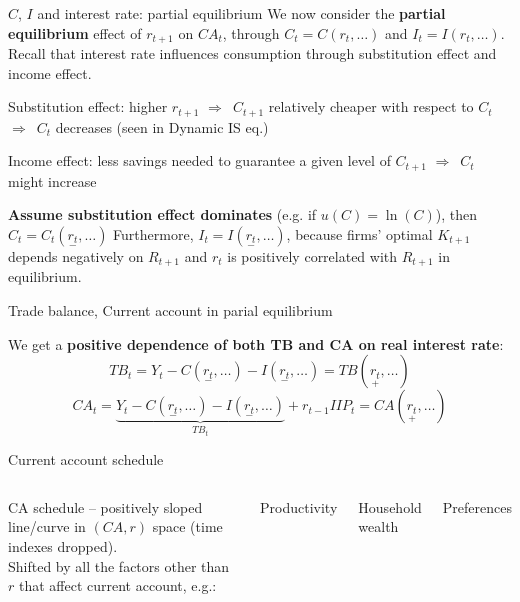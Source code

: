 \documentclass{beamer}
\newenvironment{mytemize}
{\vfill\itemize[nolistsep,itemsep=\fill,label=\color{blue}{$\triangleright$}]}
  {\enditemize}
\newenvironment{mynumerate}
{\vfill\enumerate[nolistsep,itemsep=\fill,label=\arabic*.]}
  {\endenumerate}
\newcommand{\rarr}{$\Rightarrow$\ }
\begin{document}
\begin{frame}{$C$, $I$ and interest rate: partial equilibrium}
  We now consider the \textbf{partial equilibrium} effect of $r_{t+1}$ on $CA_t$, through $C_t = C(r_{t}, \dots)$ and $I_t = I(r_{t}, \dots)$.
  \vfill
  Recall that interest rate influences consumption through substitution effect and income effect.
  \begin{mynumerate}
  \item Substitution effect: higher $r_{t+1}$ \rarr $C_{t+1}$ relatively cheaper with respect to $C_t$ \rarr $C_t$ decreases (seen in Dynamic IS eq.)
  \item Income effect: less savings needed to guarantee a given level of $C_{t+1}$ \rarr $C_t$ might increase
  \end{mynumerate}

  \textbf{Assume substitution effect dominates} (e.g. if $u(C) = \ln(C)$), then $C_t = C_t(\underset{-}{r_{t}}, \dots)$
  \vfill 
  Furthermore, $I_t = I(\underset{-}{r_{t}}, \dots)$, because firms' optimal $K_{t+1}$ depends negatively on $R_{t+1}$ and $r_t$ is positively correlated with $R_{t+1}$ in equilibrium.
\end{frame}

\begin{frame}{Trade balance, Current account in parial equilibrium}

We get a \textbf{positive dependence of both TB and CA on real interest rate}:
      $$TB_t = Y_t - C(\underset{-}{r_{t}},\dots) - I(\underset{-}{r_{t}}, \dots)= TB(\underset{+}{r_{t}},\dots)$$
      $$CA_t = \underbrace{Y_t - C(\underset{-}{r_{t}},\dots) - I(\underset{-}{r_{t}}, \dots)}_{TB_t} +  r_{t-1} IIP_t = CA(\underset{+}{r_{t}},\dots)$$
\end{frame}

\begin{frame}{Current account schedule}
  \begin{columns}
	 CA schedule -- positively sloped line/curve in $(CA, r)$ space (time indexes dropped).\\
	\vfill
  Shifted by all the factors other than $r$ that affect current account, e.g.:
  \begin{mytemize}
	\item Productivity 
	\item Household wealth 
	\item Preferences
  \end{mytemize}
  \end{columns}
  \end{frame}
\end{document}
